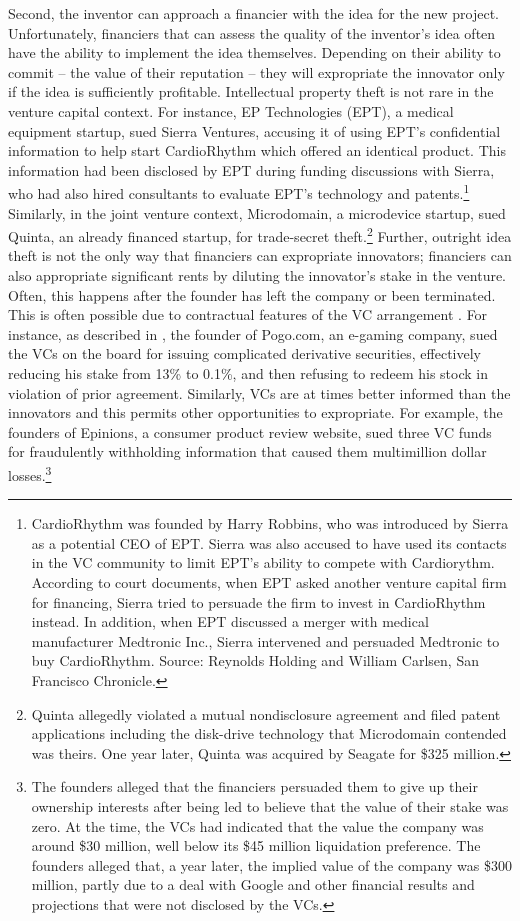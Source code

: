 \documentclass[12pt]{article}
\renewcommand{\cite}{\citet}
\begin{document}
Second, the inventor can approach a financier with the idea for the new project. Unfortunately, financiers that can assess the quality of the inventor's idea often have the ability to implement the idea themselves. Depending on their ability to commit -- the value of their reputation -- they will expropriate the innovator only if the idea is sufficiently profitable. Intellectual property theft is not rare in the venture capital context. For instance, EP Technologies (EPT), a medical equipment startup, sued Sierra Ventures, accusing it of using EPT's confidential information to help start CardioRhythm which offered an identical product. This information had been disclosed by EPT during funding discussions with Sierra, who had also hired consultants to evaluate EPT's technology and patents.\footnote{CardioRhythm  was founded by Harry Robbins, who was introduced by Sierra as a potential CEO of EPT. Sierra was also accused to have used its contacts in the VC community to limit EPT's ability to compete with Cardiorythm. According to court documents, when EPT asked another venture capital firm for financing, Sierra tried to persuade the firm to invest in CardioRhythm instead. In addition, when EPT discussed a merger with medical manufacturer Medtronic Inc., Sierra intervened and persuaded Medtronic to buy CardioRhythm. Source: Reynolds Holding and William Carlsen, San Francisco Chronicle.} Similarly, in the joint venture context, Microdomain, a microdevice startup, sued Quinta, an already financed startup, for trade-secret theft.\footnote{Quinta allegedly violated a mutual nondisclosure agreement and filed patent applications including the disk-drive technology that Microdomain contended was theirs. One year later, Quinta was acquired by Seagate for \$325 million.}
Further, outright idea theft is not the only way that financiers can expropriate innovators; financiers can also appropriate significant rents by diluting the innovator's stake in the venture. Often, this happens after the founder has left the company or been terminated. This is often possible due to contractual features of the VC arrangement \citep[see, for instance][]{KaplanStromberg2002}. For instance, as described in \cite{Atanasov2012}, the founder of Pogo.com, an e-gaming company, sued the VCs on the board for issuing complicated derivative securities, effectively reducing his stake from 13\% to 0.1\%, and then refusing to redeem his stock in violation of prior agreement. Similarly, VCs are at times better informed than the innovators and this permits other opportunities to expropriate. For example, the founders of Epinions, a consumer product review website, sued three VC funds for fraudulently withholding information that caused them multimillion dollar losses.\footnote{The founders alleged that the financiers persuaded them to give up their ownership interests after being led to believe that the value of their stake was zero. At the time, the VCs had indicated that the value the company was around \$30 million, well below its \$45 million liquidation preference. The founders alleged that, a year later, the implied value of the company was \$300 million, partly due to a deal with Google and other financial results and projections that were not disclosed by the VCs.}
\end{document}
